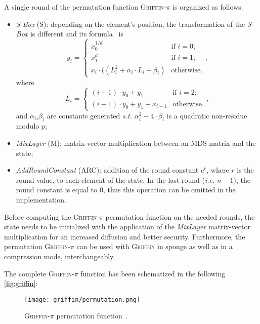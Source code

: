 \documentclass[12pt, a4paper]{report}
\begin{document}
\newpage
A single round of the permutation function \textsc{Griffin-$\pi$} is organized as follows:
\begin{itemize}
  \item \textit{S-Box} (S): depending on the element's position, the transformation of the \textit{S-Box} is different and its formula~\cite[Eq.~6]{griffin} is
  \begin{equation}
    y_i = \left\{
      \begin{array}{ll}
        x_0^{1/d} & \text{if } i = 0; \\
        x_1^{d} & \text{if } i = 1; \\
        x_i \cdot ((L_i^2 + \alpha_i \cdot L_i + \beta_i) & \text{otherwise}.
      \end{array}
    \right.,
    \label{eq:griffinsbox}
  \end{equation}
  where
  \begin{equation}
    L_i = \left\{
      \begin{array}{ll}
        (i-1) \cdot y_0 + y_1 & \text{if } i = 2; \\
        (i-1) \cdot y_0 + y_1 + x_{i-1} & \text{otherwise}.
      \end{array}
    \right.,
    \label{eq:griffinli}
  \end{equation}
  and $\alpha_i$,$\beta_i$ are constants generated \textsl{s.t.} $\alpha_i^2 - 4 \cdot \beta_i$ is a quadratic non-residue modulo $p$;
  \item \textit{MixLayer} (M): matrix-vector multiplication between an MDS matrix and the state;
  \item \textit{AddRoundConstant} (ARC): addition of the round constant $c^r$, where $r$ is the round value, to each element of the state. In the last round (\textsl{i.e.} $n-1$), the round constant is equal to 0, thus this operation can be omitted in the implementation.
\end{itemize}

Before computing the \textsc{Griffin-$\pi$} permutation function on the needed rounds, the state needs to be initialized with the application of the \textit{MixLayer} matrix-vector multiplication for an increased diffusion and better security.
Furthermore, the permutation \textsc{Griffin-$\pi$} can be used with \textsc{Griffin} in sponge as well as in a compression mode, interchangeably. 

The complete \textsc{Griffin-$\pi$} function has been schematized in the following \autoref{fig:griffin}:
\begin{figure}[H]
  \begin{center}
    \texttt{[image: griffin/permutation.png]}
  \end{center}
  \caption{\textsc{Griffin-$\pi$} permutation function~\cite[Fig.~2]{griffin}.}\label{fig:griffin}
\end{figure}
\end{document}
